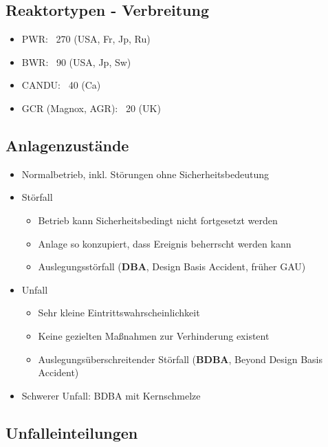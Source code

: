 \documentclass[12pt]{article}
\begin{document}
\subsection{Reaktortypen - Verbreitung}
\begin{itemize}
  \item PWR: ~270 (USA, Fr, Jp, Ru)
  \item BWR: ~90 (USA, Jp, Sw)
  \item CANDU: ~40 (Ca)
  \item GCR (Magnox, AGR): ~20 (UK)
\end{itemize}

\subsection{Anlagenzustände}
\begin{itemize}
  \item Normalbetrieb, inkl. Störungen ohne Sicherheitsbedeutung
  \item Störfall
  \begin{itemize}
    \item Betrieb kann Sicherheitsbedingt nicht fortgesetzt werden
    \item Anlage so konzupiert, dass Ereignis beherrscht werden kann
    \item Auslegungsstörfall (\textbf{DBA}, Design Basis Accident, früher GAU)
  \end{itemize}
  \item Unfall
  \begin{itemize}
    \item Sehr kleine Eintrittswahrscheinlichkeit
    \item Keine gezielten Maßnahmen zur Verhinderung existent
    \item Auslegungsüberschreitender Störfall (\textbf{BDBA}, Beyond Design Basis Accident)
  \end{itemize}
  \item Schwerer Unfall: BDBA mit Kernschmelze
\end{itemize}

\subsection{Unfalleinteilungen}
\end{document}

